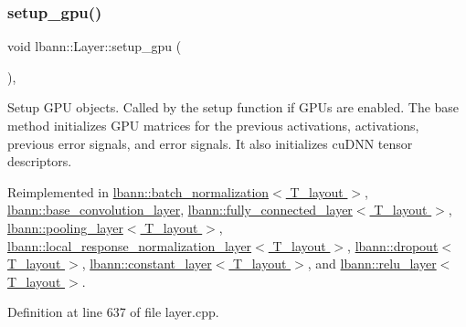 \mbox{\label{classlbann_1_1Layer_a36aa22ef90ce4de65abe729d38490863}} 
\subsubsection{\texorpdfstring{setup\+\_\+gpu()}{setup\_gpu()}}
{\footnotesize\ttfamily void lbann\+::\+Layer\+::setup\+\_\+gpu (\begin{DoxyParamCaption}{ }\end{DoxyParamCaption})\hspace{0.3cm}{\ttfamily [protected]}, {\ttfamily [virtual]}}

Setup G\+PU objects. Called by the setup function if G\+P\+Us are enabled. The base method initializes G\+PU matrices for the previous activations, activations, previous error signals, and error signals. It also initializes cu\+D\+NN tensor descriptors. 

Reimplemented in \hyperlink{classlbann_1_1batch__normalization_ab4737c3efcafa9bff1e68084b7f36283}{lbann\+::batch\+\_\+normalization$<$ T\+\_\+layout $>$}, \hyperlink{classlbann_1_1base__convolution__layer_a4fb0ec8793656a7c32ff37c266b29a68}{lbann\+::base\+\_\+convolution\+\_\+layer}, \hyperlink{classlbann_1_1fully__connected__layer_a95c96742a67f2e9398e608b244c2d121}{lbann\+::fully\+\_\+connected\+\_\+layer$<$ T\+\_\+layout $>$}, \hyperlink{classlbann_1_1pooling__layer_a603adc8abc7527f2fd12eb4264b0f3cc}{lbann\+::pooling\+\_\+layer$<$ T\+\_\+layout $>$}, \hyperlink{classlbann_1_1local__response__normalization__layer_aff5210d74db5f8302989cca12d04263d}{lbann\+::local\+\_\+response\+\_\+normalization\+\_\+layer$<$ T\+\_\+layout $>$}, \hyperlink{classlbann_1_1dropout_abaa3d0c6d99200b186d0a55201f77b6a}{lbann\+::dropout$<$ T\+\_\+layout $>$}, \hyperlink{classlbann_1_1constant__layer_aa3450d358b093a29067500acc0ac4dff}{lbann\+::constant\+\_\+layer$<$ T\+\_\+layout $>$}, and \hyperlink{classlbann_1_1relu__layer_a9426317aa741ab8a202ee52cf5250b59}{lbann\+::relu\+\_\+layer$<$ T\+\_\+layout $>$}.



Definition at line 637 of file layer.\+cpp.


